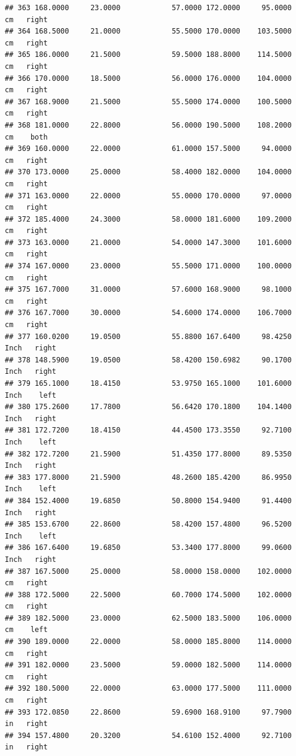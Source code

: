 \documentclass[]{article}
\begin{document}
\begin{verbatim}
## 363 168.0000     23.0000            57.0000 172.0000     95.0000     cm   right
## 364 168.5000     21.0000            55.5000 170.0000    103.5000     cm   right
## 365 186.0000     21.5000            59.5000 188.8000    114.5000     cm   right
## 366 170.0000     18.5000            56.0000 176.0000    104.0000     cm   right
## 367 168.9000     21.5000            55.5000 174.0000    100.5000     cm   right
## 368 181.0000     22.8000            56.0000 190.5000    108.2000     cm    both
## 369 160.0000     22.0000            61.0000 157.5000     94.0000     cm   right
## 370 173.0000     25.0000            58.4000 182.0000    104.0000     cm   right
## 371 163.0000     22.0000            55.0000 170.0000     97.0000     cm   right
## 372 185.4000     24.3000            58.0000 181.6000    109.2000     cm   right
## 373 163.0000     21.0000            54.0000 147.3000    101.6000     cm   right
## 374 167.0000     23.0000            55.5000 171.0000    100.0000     cm   right
## 375 167.7000     31.0000            57.6000 168.9000     98.1000     cm   right
## 376 167.7000     30.0000            54.6000 174.0000    106.7000     cm   right
## 377 160.0200     19.0500            55.8800 167.6400     98.4250   Inch   right
## 378 148.5900     19.0500            58.4200 150.6982     90.1700   Inch   right
## 379 165.1000     18.4150            53.9750 165.1000    101.6000   Inch    left
## 380 175.2600     17.7800            56.6420 170.1800    104.1400   Inch   right
## 381 172.7200     18.4150            44.4500 173.3550     92.7100   Inch    left
## 382 172.7200     21.5900            51.4350 177.8000     89.5350   Inch   right
## 383 177.8000     21.5900            48.2600 185.4200     86.9950   Inch    left
## 384 152.4000     19.6850            50.8000 154.9400     91.4400   Inch   right
## 385 153.6700     22.8600            58.4200 157.4800     96.5200   Inch    left
## 386 167.6400     19.6850            53.3400 177.8000     99.0600   Inch   right
## 387 167.5000     25.0000            58.0000 158.0000    102.0000     cm   right
## 388 172.5000     22.5000            60.7000 174.5000    102.0000     cm   right
## 389 182.5000     23.0000            62.5000 183.5000    106.0000     cm    left
## 390 189.0000     22.0000            58.0000 185.8000    114.0000     cm   right
## 391 182.0000     23.5000            59.0000 182.5000    114.0000     cm   right
## 392 180.5000     22.0000            63.0000 177.5000    111.0000     cm   right
## 393 172.0850     22.8600            59.6900 168.9100     97.7900     in   right
## 394 157.4800     20.3200            54.6100 152.4000     92.7100     in   right

\end{verbatim}
\end{document}
